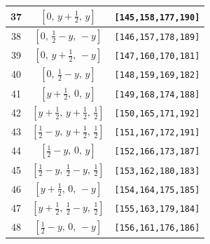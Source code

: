 \documentclass[fleqn,8pt]{jsarticle}
\begin{document}
\begin{longtable}{ccc}
37 & $\left[ 0,\, y + \frac{1}{2},\, y \right]$ & {\tt [145,158,177,190]} \\ \hline
38 & $\left[ 0,\, \frac{1}{2} - y,\, - y \right]$ & {\tt [146,157,178,189]} \\ \hline
39 & $\left[ 0,\, y + \frac{1}{2},\, - y \right]$ & {\tt [147,160,170,181]} \\ \hline
40 & $\left[ 0,\, \frac{1}{2} - y,\, y \right]$ & {\tt [148,159,169,182]} \\ \hline
41 & $\left[ y + \frac{1}{2},\, 0,\, y \right]$ & {\tt [149,168,174,188]} \\ \hline
42 & $\left[ y + \frac{1}{2},\, y + \frac{1}{2},\, \frac{1}{2} \right]$ & {\tt [150,165,171,192]} \\ \hline
43 & $\left[ \frac{1}{2} - y,\, y + \frac{1}{2},\, \frac{1}{2} \right]$ & {\tt [151,167,172,191]} \\ \hline
44 & $\left[ \frac{1}{2} - y,\, 0,\, y \right]$ & {\tt [152,166,173,187]} \\ \hline
45 & $\left[ \frac{1}{2} - y,\, \frac{1}{2} - y,\, \frac{1}{2} \right]$ & {\tt [153,162,180,183]} \\ \hline
46 & $\left[ y + \frac{1}{2},\, 0,\, - y \right]$ & {\tt [154,164,175,185]} \\ \hline
47 & $\left[ y + \frac{1}{2},\, \frac{1}{2} - y,\, \frac{1}{2} \right]$ & {\tt [155,163,179,184]} \\ \hline
48 & $\left[ \frac{1}{2} - y,\, 0,\, - y \right]$ & {\tt [156,161,176,186]} \\
\end{longtable}
\renewcommand{\arraystretch}{1.2}
\end{document}
